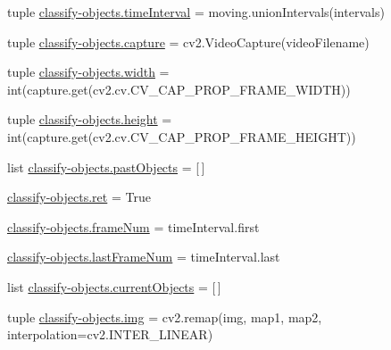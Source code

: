 \begin{DoxyCompactItemize}
\item 
tuple \hyperlink{namespaceclassify-objects_a8be49b00fd14af2327a9ef9c0084c8b6}{classify-\/objects.\-time\-Interval} = moving.\-union\-Intervals(intervals)
\item 
tuple \hyperlink{namespaceclassify-objects_a0ee3ef5cf12219ccc80e40d1f741a53f}{classify-\/objects.\-capture} = cv2.\-Video\-Capture(video\-Filename)
\item 
tuple \hyperlink{namespaceclassify-objects_a05deb0bc9671ae9d769c220c5af3e781}{classify-\/objects.\-width} = int(capture.\-get(cv2.\-cv.\-C\-V\-\_\-\-C\-A\-P\-\_\-\-P\-R\-O\-P\-\_\-\-F\-R\-A\-M\-E\-\_\-\-W\-I\-D\-T\-H))
\item 
tuple \hyperlink{namespaceclassify-objects_a49e08fdaa91f51e67615275c9d62099f}{classify-\/objects.\-height} = int(capture.\-get(cv2.\-cv.\-C\-V\-\_\-\-C\-A\-P\-\_\-\-P\-R\-O\-P\-\_\-\-F\-R\-A\-M\-E\-\_\-\-H\-E\-I\-G\-H\-T))
\item 
list \hyperlink{namespaceclassify-objects_a09225cc5985019451088fff6618bdd15}{classify-\/objects.\-past\-Objects} = \mbox{[}$\,$\mbox{]}
\item 
\hyperlink{namespaceclassify-objects_a67b10043840081536767e4c95033b1b0}{classify-\/objects.\-ret} = True
\item 
\hyperlink{namespaceclassify-objects_a5452b0de8b058d1fa012cffe547284ce}{classify-\/objects.\-frame\-Num} = time\-Interval.\-first
\item 
\hyperlink{namespaceclassify-objects_ade30e76ac38705c0657407fed60aa3fe}{classify-\/objects.\-last\-Frame\-Num} = time\-Interval.\-last
\item 
list \hyperlink{namespaceclassify-objects_af8b0f1db8c1d66c558d32713da5c1245}{classify-\/objects.\-current\-Objects} = \mbox{[}$\,$\mbox{]}
\item 
tuple \hyperlink{namespaceclassify-objects_a4fe0e391a47a3e5af1350ab57e1ef60e}{classify-\/objects.\-img} = cv2.\-remap(img, map1, map2, interpolation=cv2.\-I\-N\-T\-E\-R\-\_\-\-L\-I\-N\-E\-A\-R)
\end{DoxyCompactItemize}
